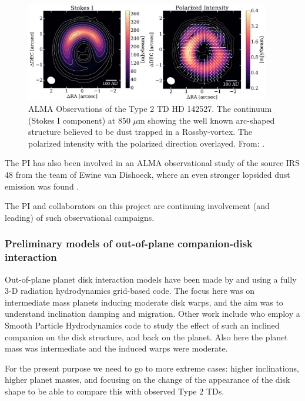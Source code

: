 \documentclass[10pt,fleqn,twoside,a4paper]{article}
\begin{document}
\begin{figure}
\centerline{\includegraphics[width=0.95\textwidth]{D2Fig/Kataoka-eps-converted-to.pdf}}
\caption{\label{fig-kataoka} ALMA Observations of the Type 2 TD HD 142527.
   The continuum (Stokes I component) at 850 $\mu$m
  showing the well known arc-shaped structure believed to be dust trapped in
  a Rossby-vortex.   The polarized intensity with the
  polarized direction overlayed.  From: \citet{2016ApJ...831L..12K}.}
\end{figure}

The PI has also been involved in an ALMA observational study of the source
IRS 48 from the team of Ewine van Dishoeck, where an even stronger lopsided
dust emission was found \citep{2013Sci...340.1199V}. 

The PI and collaborators on this project are continuing involvement (and
leading) of such observational campaigns.


\subsubsection{Preliminary models of out-of-plane companion-disk interaction}
Out-of-plane planet disk interaction models have been made by
\citet{2011A&A...530A..41B} and \citet{2013A&A...555A.124B} using a fully
3-D radiation hydrodynamics grid-based code. 
The focus here was on intermediate mass planets inducing moderate
disk warps, and the aim was to understand inclination damping and
migration. Other work include \citet{2013MNRAS.431.1320X} who employ
a Smooth Particle Hydrodynamics code to study the effect of such an
inclined companion on the disk structure, and back on the planet. Also
here the planet mass was intermediate and the induced warps were moderate.
 
For the present purpose we need to go to more extreme cases: higher
inclinations, higher planet masses, and focusing on the change of the
appearance of the disk shape to be able to compare this with observed Type 2
TDs.
\end{document}
